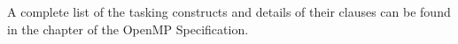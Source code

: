 A complete list of the tasking constructs and details of their clauses
can be found in the  chapter of the OpenMP Specification.














